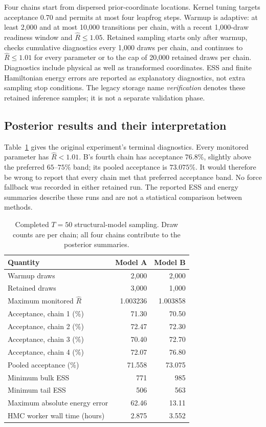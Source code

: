 Four chains start from dispersed prior-coordinate locations.  Kernel tuning
targets acceptance 0.70 and permits at most four leapfrog steps.  Warmup is
adaptive: at least 2,000 and at most 10,000 transitions per chain, with a
recent 1,000-draw readiness window and $\widehat R\leq1.05$.
Retained sampling starts only after warmup, checks cumulative diagnostics
every 1,000 draws per chain, and continues to $\widehat R\leq1.01$ for every
parameter or to the cap of 20,000 retained draws per chain.  Diagnostics
include physical as well as transformed coordinates.  ESS and finite
Hamiltonian energy errors are reported as explanatory diagnostics, not extra
sampling stop conditions.  The legacy storage name \emph{verification}
denotes these retained inference samples; it is not a separate validation phase.

\subsection{Posterior results and their interpretation}

Table~\ref{tab:bf-structural-ab-sampling} gives the original experiment's
terminal diagnostics.
Every monitored parameter has $\widehat R<1.01$.  B's fourth chain has
acceptance $76.8\%$, slightly above the preferred $65$--$75\%$ band; its pooled
acceptance is $73.075\%$.  It would therefore be wrong to report that every
chain met that preferred acceptance band.  No force fallback was recorded
in either retained run.  The reported ESS and energy summaries describe
these runs and are not a statistical comparison between methods.

\begin{table}[htbp]
\centering\small
\caption{Completed $T=50$ structural-model sampling.  Draw counts are per
chain; all four chains contribute to the posterior summaries.}
\label{tab:bf-structural-ab-sampling}
\begin{tabular}{lrr}
\toprule
Quantity & Model A & Model B\\
\midrule
Warmup draws & 2,000 & 2,000\\
Retained draws & 3,000 & 1,000\\
Maximum monitored $\widehat R$ & 1.003236 & 1.003858\\
Acceptance, chain 1 (\%) & 71.30 & 70.50\\
Acceptance, chain 2 (\%) & 72.47 & 72.30\\
Acceptance, chain 3 (\%) & 70.40 & 72.70\\
Acceptance, chain 4 (\%) & 72.07 & 76.80\\
Pooled acceptance (\%) & 71.558 & 73.075\\
Minimum bulk ESS & 771 & 985\\
Minimum tail ESS & 506 & 563\\
Maximum absolute energy error & 62.46 & 13.11\\
HMC worker wall time (hours) & 2.875 & 3.552\\
\bottomrule
\end{tabular}
\end{table}

